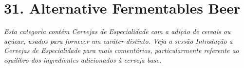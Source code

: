 \section*{31. Alternative Fermentables Beer}
\textit{Esta categoria contém Cervejas de Especialidade com a adição de cereais ou açúcar, usados para fornecer um caráter distinto. Veja a sessão Introdução a Cervejas de Especialidade para mais comentários, particularmente referente ao equilíbro dos ingredientes adicionados à cerveja base.}
